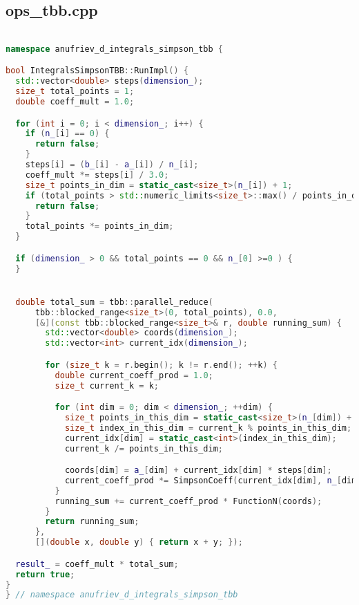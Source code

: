 \documentclass[a4paper,12pt]{article}
\begin{document}
\subsection{ops\_tbb.cpp}
\begin{lstlisting}[language=C++, caption=Функция RunImpl из ops\_tbb.cpp, basicstyle=\ttfamily\tiny]

namespace anufriev_d_integrals_simpson_tbb {

bool IntegralsSimpsonTBB::RunImpl() {
  std::vector<double> steps(dimension_);
  size_t total_points = 1;
  double coeff_mult = 1.0;

  for (int i = 0; i < dimension_; i++) {
    if (n_[i] == 0) {
      return false;
    }
    steps[i] = (b_[i] - a_[i]) / n_[i];
    coeff_mult *= steps[i] / 3.0;
    size_t points_in_dim = static_cast<size_t>(n_[i]) + 1;
    if (total_points > std::numeric_limits<size_t>::max() / points_in_dim) {
      return false; 
    }
    total_points *= points_in_dim;
  }

  if (dimension_ > 0 && total_points == 0 && n_[0] >=0 ) {
  }


  double total_sum = tbb::parallel_reduce(
      tbb::blocked_range<size_t>(0, total_points), 0.0,
      [&](const tbb::blocked_range<size_t>& r, double running_sum) {
        std::vector<double> coords(dimension_);
        std::vector<int> current_idx(dimension_);

        for (size_t k = r.begin(); k != r.end(); ++k) {
          double current_coeff_prod = 1.0;
          size_t current_k = k;

          for (int dim = 0; dim < dimension_; ++dim) {
            size_t points_in_this_dim = static_cast<size_t>(n_[dim]) + 1;
            size_t index_in_this_dim = current_k % points_in_this_dim;
            current_idx[dim] = static_cast<int>(index_in_this_dim);
            current_k /= points_in_this_dim;

            coords[dim] = a_[dim] + current_idx[dim] * steps[dim];
            current_coeff_prod *= SimpsonCoeff(current_idx[dim], n_[dim]);
          }
          running_sum += current_coeff_prod * FunctionN(coords);
        }
        return running_sum;
      },
      [](double x, double y) { return x + y; });

  result_ = coeff_mult * total_sum;
  return true;
}
} // namespace anufriev_d_integrals_simpson_tbb
\end{lstlisting}

\newpage
\end{document}
